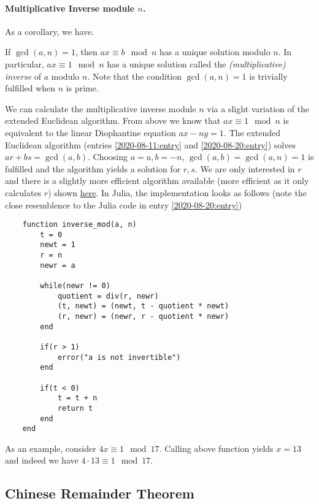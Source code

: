 \paragraph{Multiplicative Inverse module $n$.} As a corollary, we have.

\begin{theorem}
    If $\gcd(a,n) = 1$, then $a x \equiv b \mod n$ has a unique solution modulo $n$. In particular, $a x \equiv 1 \mod n$ has a unique solution called the \emph{(multiplicative) inverse} of $a$ modulo $n$. Note that the condition $\gcd(a,n) = 1$ is trivially fulfilled when $n$ is prime.
\end{theorem}

We can calculate the multiplicative inverse module $n$ via a slight variation of the extended Euclidean algorithm. From above we know that $ax \equiv 1 \mod n$ is equivalent to the linear Diophantine equation $ax - ny = 1$. The extended Euclidean algorithm (entries \ref{2020-08-11:entry} and \ref{2020-08-20:entry}) solves $ar + bs = \gcd(a,b)$. Choosing $a = a, b = -n$, $\gcd(a,b) = \gcd(a, n) = 1$ is fulfilled and the algorithm yields a solution for $r,s$. We are only interested in $r$ and there is a slightly more efficient algorithm available (more efficient as it only calculates $r$) shown \href{https://en.wikipedia.org/wiki/Extended_Euclidean_algorithm}{here}. In Julia, the implementation looks as follows (note the close resemblence to the Julia code in entry \ref{2020-08-20:entry})

\begin{verbatim}
    function inverse_mod(a, n)
        t = 0
        newt = 1
        r = n
        newr = a

        while(newr != 0)
            quotient = div(r, newr)
            (t, newt) = (newt, t - quotient * newt) 
            (r, newr) = (newr, r - quotient * newr)
        end

        if(r > 1)
            error("a is not invertible")
        end

        if(t < 0)
            t = t + n
            return t
        end
    end
\end{verbatim}

As an example, consider $4x \equiv 1 \mod 17$. Calling above function yields $x = 13$ and indeed we have $4 \cdot 13 \equiv 1 \mod 17$.

\subsection{Chinese Remainder Theorem}

